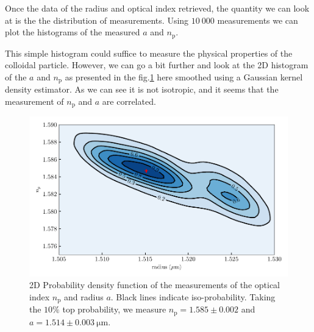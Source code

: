 Once the data of the radius and optical index retrieved, the quantity we can look at is the the distribution of measurements. Using $10 ~ 000$ measurements we can plot the histograms of the measured $a$ and $n_\mathrm{p}$.




This simple histogram could suffice to measure the physical properties of the colloidal particle. However, we can go a bit further and look at the 2D histogram of the $a$ and $n_\mathrm{p}$ as presented in the fig.\ref{fig:KDErn} here smoothed using a Gaussian kernel density estimator. As we can see it is not isotropic, and it seems that the measurement of $n_\mathrm{p}$ and $a$ are correlated.
 

\begin{figure}[!ht]
	\centering
	\includegraphics{02_body/chapter2/images/KDErn.pdf}
	\caption{2D Probability density function of the measurements of the optical index $n_\mathrm{p}$ and radius $a$. Black lines indicate iso-probability. Taking the $10\% $ top probability, we measure $n_\mathrm{p} = 1.585 \pm 0.002$ and $a=1.514 \pm 0.003 ~ \mathrm{\mu m}$. }
	\label{fig:KDErn}
\end{figure}